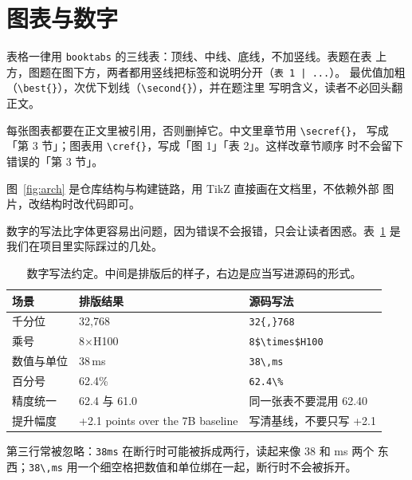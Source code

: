 \section{图表与数字}
\label{sec:figure}

表格一律用 \texttt{booktabs} 的三线表：顶线、中线、底线，不加竖线。表题在表
上方，图题在图下方，两者都用竖线把标签和说明分开（\texttt{表 1 | ...}）。
最优值加粗（\verb|\best{}|），次优下划线（\verb|\second{}|），并在题注里
写明含义，读者不必回头翻正文。

每张图表都要在正文里被引用，否则删掉它。中文里章节用 \verb|\secref{}|，
写成「第 3 节」；图表用 \verb|\cref{}|，写成「图 1」「表 2」。这样改章节顺序
时不会留下错误的「第 3 节」。

图~\ref{fig:arch} 是仓库结构与构建链路，用 TikZ 直接画在文档里，不依赖外部
图片，改结构时改代码即可。



数字的写法比字体更容易出问题，因为错误不会报错，只会让读者困惑。表~\ref{tab:numbers}
是我们在项目里实际踩过的几处。

\begin{table}[htbp]
  \centering
  \small
  \caption{数字写法约定。中间是排版后的样子，右边是应当写进源码的形式。}
  \label{tab:numbers}
  \begin{tabular}{@{}lll@{}}
    \toprule
    场景 & 排版结果 & 源码写法 \\
    \midrule
    千分位        & 32,768      & \texttt{32\{,\}768} \\
    乘号          & 8$\times$H100 & \texttt{8\$\textbackslash times\$H100} \\
    数值与单位    & 38\,ms      & \texttt{38\textbackslash,ms} \\
    百分号        & 62.4\%      & \texttt{62.4\textbackslash\%} \\
    精度统一      & 62.4 与 61.0 & 同一张表不要混用 62.40 \\
    提升幅度      & +2.1 points over the 7B baseline & 写清基线，不要只写 +2.1 \\
    \bottomrule
  \end{tabular}
\end{table}

第三行常被忽略：\texttt{38ms} 在断行时可能被拆成两行，读起来像 38 和 ms 两个
东西；\verb|38\,ms| 用一个细空格把数值和单位绑在一起，断行时不会被拆开。
